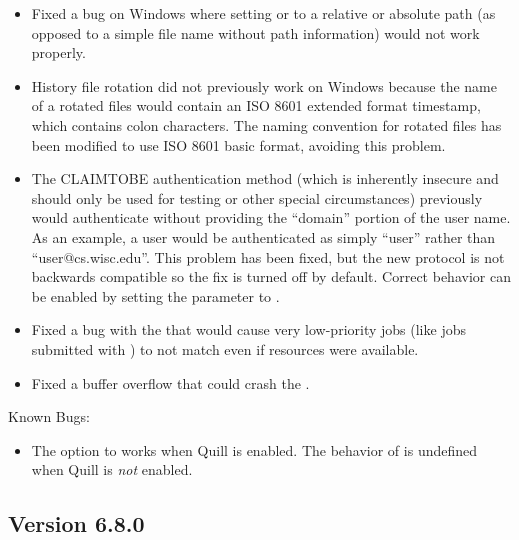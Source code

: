 \begin{itemize}
\item Fixed a bug on Windows where setting  or
 to a relative or absolute path (as opposed to a
simple file name without path information) would not work properly.

\item History file rotation did not previously work on Windows because
the name of a rotated files would contain an ISO 8601 extended format
timestamp, which contains colon characters. The naming convention for
rotated files has been modified to use ISO 8601 basic format, avoiding
this problem.

\item The CLAIMTOBE authentication method (which is inherently
insecure and should only be used for testing or other special
circumstances) previously would authenticate without providing the
``domain'' portion of the user name. As an example, a user would be
authenticated as simply ``user'' rather than
``user@cs.wisc.edu''. This problem has been fixed, but the new
protocol is not backwards compatible so the fix is turned off by
default. Correct behavior can be enabled by setting the
 parameter to .

\item Fixed a bug with the  that
would cause very low-priority jobs (like jobs submitted with
) to not match even if resources were available.

\item Fixed a buffer overflow that could crash the .

\end{itemize}

\noindent Known Bugs:

\begin{itemize}

\item The  option to  works
when Quill is enabled.  The behavior of 
 is undefined when Quill is \emph{not}
enabled.

\end{itemize}




\subsection*{\label{sec:New-6-8-0}Version 6.8.0}


